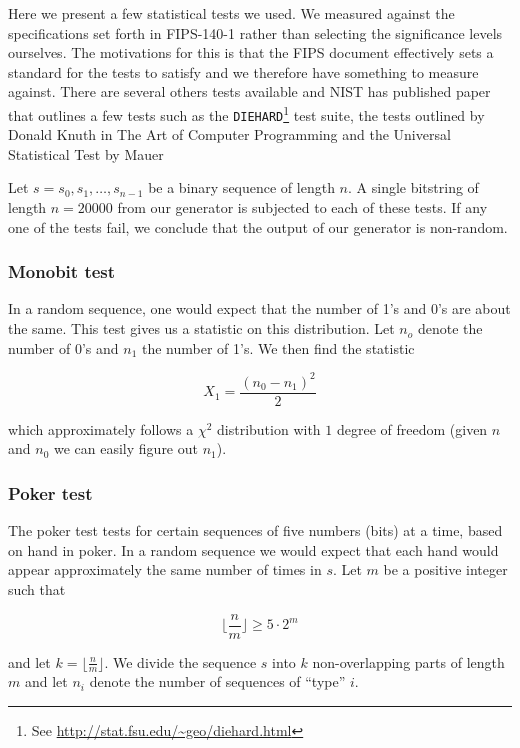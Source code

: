 \documentclass[a4paper]{article}           %
\begin{document}
 Here we present a few statistical tests we used. We measured against the specifications set forth in FIPS-140-1\cite{fips140, menezes1996} rather than selecting the significance levels ourselves. The motivations for this is that the FIPS document effectively sets a standard for the tests to satisfy and we therefore have something to measure against. There are several others tests available and NIST has published paper\cite{nist} that outlines a few tests such as the \texttt{DIEHARD}\footnote{See \url{http://stat.fsu.edu/~geo/diehard.html}} test suite, the tests outlined by Donald Knuth in The Art of Computer Programming and the Universal Statistical Test by Mauer\cite{mauer}

Let $s = s_0, s_1, \ldots, s_{n-1}$ be a binary sequence of length $n$. A single bitstring of length $n = 20000$ from our generator is subjected to each of these tests. If any one of the tests fail, we conclude that the output of our generator is non-random. 

\subsubsection{Monobit test}

In a random sequence, one would expect that the number of 1's and 0's are about the same. This test gives us a statistic on this distribution. Let $n_o$ denote the number of 0's and $n_1$ the number of 1's. We then find the statistic

\begin{equation}
X_1 = \frac{(n_0 - n_1)^2}{2}
\end{equation}

which approximately follows a $\chi^2$ distribution with $1$ degree of freedom (given $n$ and $n_0$ we can easily figure out $n_1$). 

\subsubsection{Poker test}

The poker test tests for certain sequences of five numbers (bits) at a time, based on hand in poker. In a random sequence we would expect that each hand would appear approximately the same number of times in $s$. Let $m$ be a positive integer such that 

\[
\lfloor \frac n m \rfloor \geq 5 \cdot 2^m  
\]

and let $k = \lfloor \frac n m \rfloor$. We divide the sequence $s$ into $k$ non-overlapping parts of length $m$ and let $n_i$ denote the number of sequences of ``type'' $i$.
\end{document}
